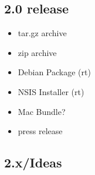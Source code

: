 \documentclass[a4paper]{report}
\begin{document}
\subsection{2.0 release}

\begin{itemize}
\item tar.gz archive
\item zip archive
\item Debian Package (rt)
\item NSIS Installer (rt)
\item Mac Bundle?
\item press release
\end{itemize}

\subsection{2.x/Ideas}
\end{document}
